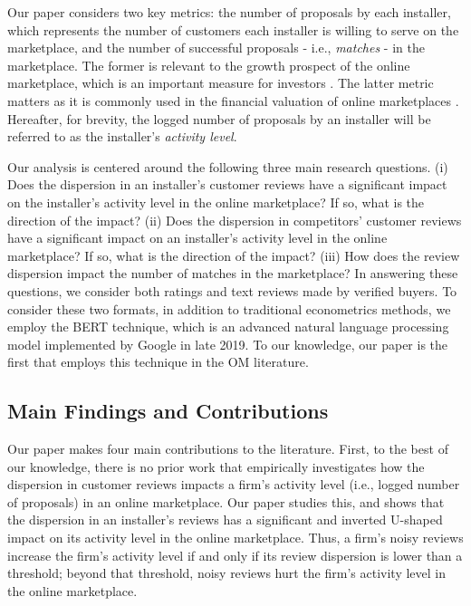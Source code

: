 \documentclass[mnsc,blindrev]{informs3}
\begin{document}
	Our paper considers two key metrics: the number of proposals by each installer, which represents the number of customers each installer is willing to serve on the marketplace, and the number of successful proposals - i.e., \emph{matches} - in the marketplace. The former is relevant to the growth prospect of the online marketplace, which is an important measure for investors \citep{baker}.  The latter metric matters as it is commonly used in the financial valuation of online marketplaces \citep{boris_2018,galston_2017}. Hereafter, for brevity, the logged number of proposals by an installer will be referred to as the installer's \emph{activity level}.
	
	Our analysis is centered around the following three main research questions. (i) Does the dispersion in an installer's customer reviews have a significant impact on the installer's activity level in the online marketplace?  If so, what is the direction of the impact? (ii) Does the dispersion in competitors' customer reviews have a significant impact on an installer's activity level in the online marketplace? If so, what is the direction of the impact? (iii) How does the review dispersion impact the number of matches in the marketplace?  In answering these questions, we consider both  ratings and text reviews made by verified buyers. To consider these two formats, in addition to traditional econometrics methods, we employ the BERT technique, which is an advanced natural language processing model implemented by Google in late 2019. To our knowledge, our paper is the first that employs this technique in the OM literature.
	
\subsection{Main Findings and Contributions}
	
Our paper makes four main contributions to the literature. First, to the best of our knowledge, there is no prior work that empirically investigates how the dispersion in customer reviews impacts a firm's activity level (i.e., logged number of proposals) in an online marketplace. Our paper studies this, and shows that the dispersion in an installer's reviews has a significant and inverted U-shaped impact on its activity level in the online marketplace. Thus, a firm's noisy reviews increase the firm's activity level if and only if its review dispersion is lower than a threshold; beyond that threshold, noisy reviews hurt the firm's activity level in the online marketplace.
	
\end{document}

